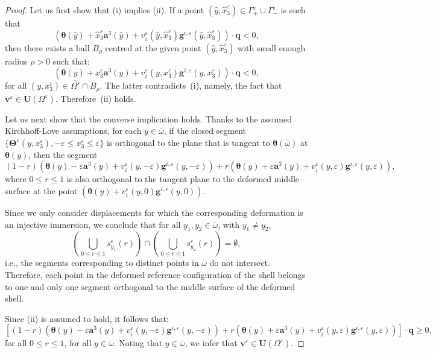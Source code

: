 \documentclass{amsart}
\begin{document}
\begin{proof}
	Let us first show that (i) implies (ii).
	If a point $(\hat{y},\hat{x}_3^\varepsilon) \in \Gamma^\varepsilon_+ \cup \Gamma^\varepsilon_{-}$ is such that
	$$
	(\bm{\theta}(\hat{y})+\hat{x}_3^\varepsilon \bm{a}^3(\hat{y}) +v_i^\varepsilon(\hat{y},\hat{x}_3^\varepsilon)\bm{g}^{i,\varepsilon}(\hat{y},\hat{x}_3^\varepsilon)) \cdot\bm{q} <0,
	$$
	then there exists a ball $B_\rho$ centred at the given point $(\hat{y},\hat{x}_3^\varepsilon)$ with small enough radius $\rho>0$ such that:
	$$
	(\bm{\theta}(y)+ x_3^\varepsilon \bm{a}^3(y) +v_i^\varepsilon(y,x_3^\varepsilon)\bm{g}^{i,\varepsilon}(y,x_3^\varepsilon)) \cdot\bm{q} <0,
	$$
	for all $(y,x_3^\varepsilon) \in \overline{\Omega^\varepsilon}\cap B_\rho$. The latter contradicts~(i), namely, the fact that $\bm{v}^\varepsilon \in \bm{U}(\Omega^\varepsilon)$. Therefore~(ii) holds.
	
	Let us next show that the converse implication holds. Thanks to the assumed Kirchhoff-Love assumptions, for each $y \in\overline{\omega}$, if the closed segment $\{\bm{\Theta}^\varepsilon(y,x_3^\varepsilon), -\varepsilon \le x_3^\varepsilon \le \varepsilon\}$ is orthogonal to the plane that is tangent to $\bm{\theta}(\overline{\omega})$ at $\bm{\theta}(y)$, then the segment
	$$
	(1-r)\left(\bm{\theta}(y) -\varepsilon\bm{a}^3(y)+v_i^\varepsilon(y,-\varepsilon) \bm{g}^{i,\varepsilon}(y,-\varepsilon)\right)
	+r\left(\bm{\theta}(y) +\varepsilon\bm{a}^3(y)+v_i^\varepsilon(y,\varepsilon) \bm{g}^{i,\varepsilon}(y,\varepsilon)\right),
	$$
	where $0\le r \le 1$ is also orthogonal to the tangent plane to the deformed middle surface at the point $(\bm{\theta}(y)+v_i^\varepsilon(y,0)\bm{g}^{i,\varepsilon}(y,0))$.
	
	Since we only consider displacements for which the corresponding deformation is an injective immersion, we conclude that for all $y_1, y_2 \in \overline{\omega}$, with $y_1 \neq y_2$,
	$$
	\left(\bigcup_{0\le r\le 1} s_{y_1}^\varepsilon(r)\right) \cap \left(\bigcup_{0\le r\le 1} s_{y_2}^\varepsilon(r)\right) = \emptyset,
	$$
	i.e., the segments corresponding to distinct points in $\overline{\omega}$ do not intersect. Therefore, each point in the deformed reference configuration of the shell belongs to one and only one segment orthogonal to the middle surface of the deformed shell.
	
	Since (ii) is assumed to hold, it follows that:
	\begin{equation*}
		\label{confsegm}
		\left[(1-r)\left(\bm{\theta}(y) -\varepsilon\bm{a}^3(y)+v_i^\varepsilon(y,-\varepsilon) \bm{g}^{i,\varepsilon}(y,-\varepsilon)\right)
		+r\left(\bm{\theta}(y) +\varepsilon\bm{a}^3(y)+v_i^\varepsilon(y,\varepsilon) \bm{g}^{i,\varepsilon}(y,\varepsilon)\right)\right] \cdot \bm{q} \ge 0,
	\end{equation*}
	for all $0\le r \le 1$, for all $y \in \overline{\omega}$. Noting that $y\in\overline{\omega}$, we infer that $\bm{v}^\varepsilon \in \bm{U}(\Omega^\varepsilon)$.
\end{proof}
\end{document}
